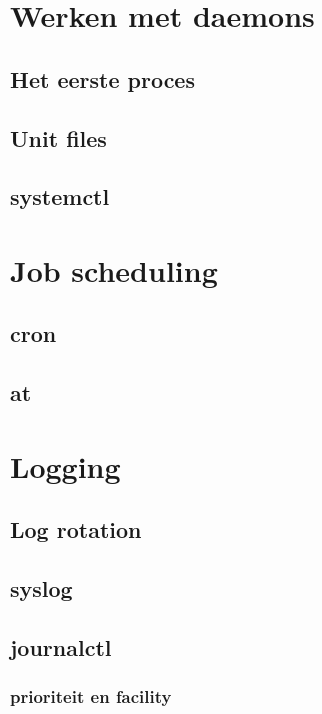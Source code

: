 \documentclass[a4paper,12pt,twoside,openright,titlepage]{book}
\begin{document}
\chapter{Werken met daemons}

\section{Het eerste proces}

\section{Unit files}

\section{systemctl}


\chapter{Job scheduling}

\section{cron}

\section{at}

\chapter{Logging}

\section{Log rotation}\label{sec:logrotate}

\section{syslog}\label{sec:syslog}


\section{journalctl}\label{sec:journalctl}

\subsection{prioriteit en facility}\label{sec:journalctl-prio_fac}

\end{document}
